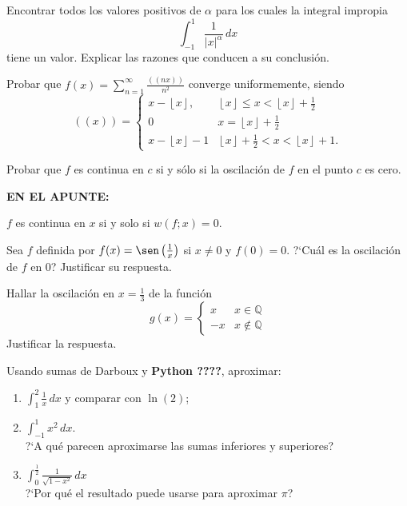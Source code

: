 \documentclass{book}
\newcommand{\qq}{\mathbb{Q}}
\begin{document}
\begin{ejer}{} Encontrar todos los valores positivos de $\alpha$ para los cuales la integral impropia 
\[
\int_{-1}^1 \frac{1}{|x|^{\alpha}}\,dx
\]
tiene un valor. Explicar las razones que conducen a su conclusión.

\end{ejer}  

\begin{ejer}{} Probar que  $f(x)=\sum\limits_{n=1}^{\infty} \frac{((nx))}{n^2}$ converge uniformemente,
siendo
\[
((x))=\left\{
\begin{array}{ll}
x-\left\lfloor x\right\rfloor, &\left\lfloor x\right\rfloor  \leq x < \left\lfloor x\right\rfloor+\frac{1}{2}
\\
0&x=\left\lfloor x\right\rfloor+\frac{1}{2}
\\
x-\left\lfloor x\right\rfloor-1 & \left\lfloor x\right\rfloor+\frac{1}{2} <x< \left\lfloor x\right\rfloor+1.
\end{array}
\right.
\]


\end{ejer} 

\begin{ejer}{} Probar que $f$ es continua en $c$ si y sólo si la oscilación de $f$ en el punto $c$ es cero. 


\textbf{EN EL APUNTE: }

$f$ es continua en $x$ si y solo si $w(f;x)=0$.



\end{ejer}

\begin{ejer}{} Sea $f$ definida por $f(x)=\sen \left(\frac{1}{x}\right)$ si $x \neq 0$ y $f(0)=0$.
?`Cuál es la oscilación de $f$ en 0? Justificar su respuesta.

\end{ejer} 

\begin{ejer}{} Hallar la oscilación en $x=\frac{1}{3}$ de la función 
\[
g(x)=\left\{
\begin{array}{ll}
x & x\in \qq
\\
-x & x\notin\qq
\end{array}
\right.
\]
Justificar la respuesta.


\end{ejer} 

\begin{ejer}{}  Usando sumas de Darboux y \textbf{Python ????}, aproximar:  
\begin{enumerate}
\item $\int_1^2\frac{1}{x}\,dx $    y comparar con $\ln(2)$; 
\item  $\int_{-1}^{1}x^2\,dx$.\\
   ?`A qu\'e parecen aproximarse las sumas inferiores y superiores?
 \item  $\int_0^{\frac{1}{2}}\frac{1}{\sqrt{1-x^2}}\,dx$\\
    ?`Por qu\'e el resultado puede usarse para aproximar $\pi$?
\end{enumerate}    

\end{ejer}  
\end{document}

